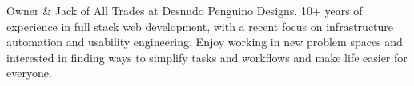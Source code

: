 

\begin{cvparagraph}

    Owner \& Jack of All Trades at Desnudo Penguino Designs. 10+ years of experience in full stack web development, with a recent focus on infrastructure automation and usability engineering. Enjoy working in new problem spaces and interested in finding ways to simplify tasks and workflows and make life easier for everyone.
\end{cvparagraph}

